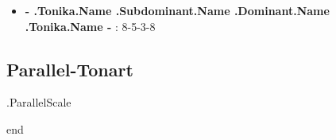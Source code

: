 \documentclass{article}
\begin{document}
\begin{multicols}{2}
\begin{itemize}
\item \textbf{ {{- .Tonika.Name }} {{ .Subdominant.Name }} {{ .Dominant.Name }} {{ .Tonika.Name -}} }: 8-5-3-8
\end{itemize}


\subsection*{Parallel-Tonart}

{{ .ParallelScale }}


%

\end{multicols}

\newpage

{{ end }}
\end{document}
